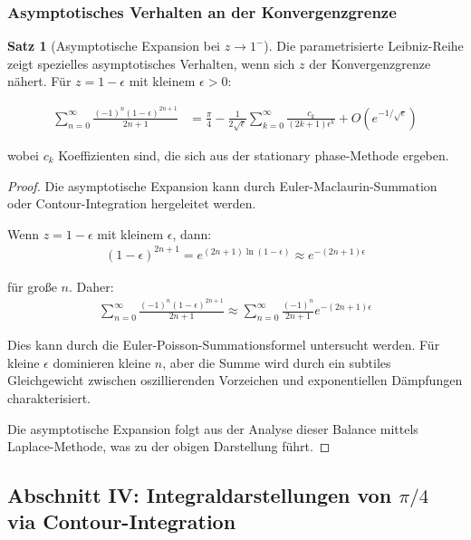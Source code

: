 \documentclass[a4paper,12pt,twoside]{report}
\theoremstyle{definition}
\newtheorem{satz}{Satz}
\begin{document}
\subsubsection{Asymptotisches Verhalten an der Konvergenzgrenze}

\begin{satz}[Asymptotische Expansion bei $z \to 1^-$]
Die parametrisierte Leibniz-Reihe zeigt spezielles asymptotisches Verhalten, wenn sich $z$ der Konvergenzgrenze nähert. Für $z = 1 - \epsilon$ mit kleinem $\epsilon > 0$:

\begin{align}
	\sum_{n=0}^{\infty} \frac{(-1)^n (1-\epsilon)^{2n+1}}{2n+1} &= \frac{\pi}{4} - \frac{1}{2\sqrt{\epsilon}} \sum_{k=0}^{\infty} \frac{c_k}{(2k+1)\epsilon^k} + O(e^{-1/\sqrt{\epsilon}})
	\label{eq:asymp_expansion}
\end{align}

wobei $c_k$ Koeffizienten sind, die sich aus der stationary phase-Methode ergeben.
\end{satz}

\begin{proof}
Die asymptotische Expansion kann durch Euler-Maclaurin-Summation oder Contour-Integration hergeleitet werden. 

Wenn $z = 1 - \epsilon$ mit kleinem $\epsilon$, dann:
\begin{align}
	(1-\epsilon)^{2n+1} = e^{(2n+1)\ln(1-\epsilon)} \approx e^{-(2n+1)\epsilon}
\end{align}

für große $n$. Daher:
\begin{align}
	\sum_{n=0}^{\infty} \frac{(-1)^n (1-\epsilon)^{2n+1}}{2n+1} \approx \sum_{n=0}^{\infty} \frac{(-1)^n}{2n+1} e^{-(2n+1)\epsilon}
\end{align}

Dies kann durch die Euler-Poisson-Summationsformel untersucht werden. Für kleine $\epsilon$ dominieren kleine $n$, aber die Summe wird durch ein subtiles Gleichgewicht zwischen oszillierenden Vorzeichen und exponentiellen Dämpfungen charakterisiert.

Die asymptotische Expansion folgt aus der Analyse dieser Balance mittels Laplace-Methode, was zu der obigen Darstellung führt.
\end{proof}

\subsection{Abschnitt IV: Integraldarstellungen von $\pi/4$ via Contour-Integration}
\end{document}
